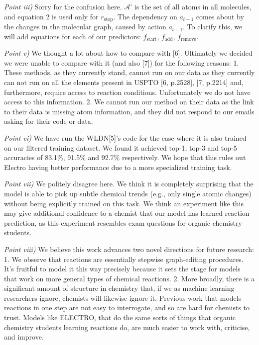\documentclass{article}
\begin{document}
\emph{Point iii)} 
Sorry for the confusion here. $\mathcal{A}’$ is the set of all atoms in all molecules, and equation 2 is used only for $r_\textrm{stop}$.
The dependency on $a_{t-1}$ comes about by the changes in the molecular graph, caused by action $a_{t-1}$. 
To clarify this, we will add equations for each of our predictors: $f_\textrm{start}$, $f_\textrm{add}$, $f_\textrm{remove}$.

\emph{Point v)} 
We thought a lot about how to compare with [6]. Ultimately we decided we were unable to compare with it (and also [7]) for the following reasons: 1.
 These methods, as they currently stand, cannot run on our data as they currently can not run on all the elements present in USPTO [6, p.2528], [7, p.2214] and, furthermore, require access to reaction conditions. 
 Unfortunately we do not have access to this information. 2. We cannot run our method on their data as the link to their data is missing atom information, and they did not respond to our emails asking for their code or data. 

\emph{Point vi)} We have run the WLDN[5]'s code for the case where it is also trained on our filtered training dataset.
 We found it achieved top-1, top-3 and top-5 accuracies of 83.1\%, 91.5\% and 92.7\% respectively. 
 We hope that this rules out Electro having better performance due to a more specialized training task.
  
\emph{Point vii)}
 We politely disagree here. We think it is completely surprising that the model is able to pick up subtle chemical trends (e.g., only single atomic changes) without being explicitly trained on this task. We think an experiment like this may give additional confidence to a chemist that our model has learned reaction prediction, as this experiment resembles exam questions for organic chemistry students. 
 
\emph{Point viii)}
We believe this work advances two novel directions for future research: 1. We observe that reactions are essentially stepwise graph-editing procedures. It’s fruitful to model it this way precisely because it sets the stage for models that work on more general types of chemical reactions. 2. More broadly, there is a significant amount of structure in chemistry that, if we as machine learning researchers ignore, chemists will likewise ignore it. Previous work that models reactions in one step are not easy to interrogate, and so are hard for chemists to trust. Models like ELECTRO, that do the same sorts of things that organic chemistry students learning reactions do, are much easier to work with, criticise, and improve.
\end{document}

